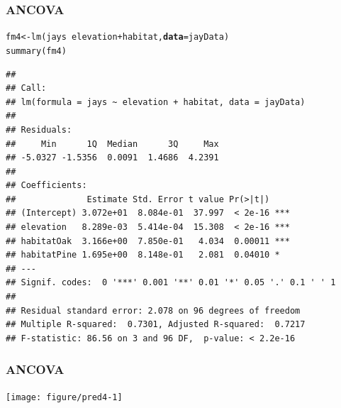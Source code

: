\documentclass[color=usenames,dvipsnames]{beamer}\usepackage[]{graphicx}\usepackage[]{color}
\makeatletter
\newcommand{\hlopt}[1]{\textcolor[rgb]{0,0,0}{#1}}%
\newcommand{\hlstd}[1]{\textcolor[rgb]{0,0,0}{#1}}%
\newcommand{\hlkwb}[1]{\textcolor[rgb]{0,0.341,0.682}{#1}}%
\newcommand{\hlkwc}[1]{\textcolor[rgb]{0,0,0}{\textbf{#1}}}%
\newcommand{\hlkwd}[1]{\textcolor[rgb]{0.004,0.004,0.506}{#1}}%
\newenvironment{kframe}{%
 \def\at@end@of@kframe{}%
 \ifinner\ifhmode%
  \def\at@end@of@kframe{\end{minipage}}%
  \begin{minipage}{\columnwidth}%
 \fi\fi%
 \def\FrameCommand##1{\hskip\@totalleftmargin \hskip-\fboxsep
 \colorbox{shadecolor}{##1}\hskip-\fboxsep
     \hskip-\linewidth \hskip-\@totalleftmargin \hskip\columnwidth}%
 \MakeFramed {\advance\hsize-\width
   \@totalleftmargin\z@ \linewidth\hsize
   \@setminipage}}%
 {\par\unskip\endMakeFramed%
 \at@end@of@kframe}
\newenvironment{knitrout}{}{} %
\makeatother
\begin{document}
\begin{frame}[fragile]
  \frametitle{ANCOVA}
\begin{knitrout}\scriptsize
{}\color{fgcolor}\begin{kframe}
\begin{alltt}
\hlstd{fm4} \hlkwb{<-} \hlkwd{lm}\hlstd{(jays} \hlopt{~} \hlstd{elevation}\hlopt{+}\hlstd{habitat,} \hlkwc{data}\hlstd{=jayData)}
\hlkwd{summary}\hlstd{(fm4)}
\end{alltt}
\begin{verbatim}
## 
## Call:
## lm(formula = jays ~ elevation + habitat, data = jayData)
## 
## Residuals:
##     Min      1Q  Median      3Q     Max 
## -5.0327 -1.5356  0.0091  1.4686  4.2391 
## 
## Coefficients:
##              Estimate Std. Error t value Pr(>|t|)    
## (Intercept) 3.072e+01  8.084e-01  37.997  < 2e-16 ***
## elevation   8.289e-03  5.414e-04  15.308  < 2e-16 ***
## habitatOak  3.166e+00  7.850e-01   4.034  0.00011 ***
## habitatPine 1.695e+00  8.148e-01   2.081  0.04010 *  
## ---
## Signif. codes:  0 '***' 0.001 '**' 0.01 '*' 0.05 '.' 0.1 ' ' 1
## 
## Residual standard error: 2.078 on 96 degrees of freedom
## Multiple R-squared:  0.7301,	Adjusted R-squared:  0.7217 
## F-statistic: 86.56 on 3 and 96 DF,  p-value: < 2.2e-16
\end{verbatim}
\end{kframe}
\end{knitrout}
\end{frame}



\begin{frame}[fragile]
  \frametitle{ANCOVA}
\begin{knitrout}
\color{fgcolor}
\texttt{[image: figure/pred4-1]} 

\end{knitrout}
\end{frame}
\end{document}
